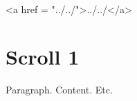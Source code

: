 \documentclass[11pt]{article}
\begin{document}
<a href = "../../">../../</a>


\section{
Scroll 1}



    Paragraph. Content. Etc.
\end{document}
